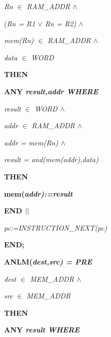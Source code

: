 \begin{sloppypar}
\hspace*{0.20in}\it Rn $\in$  \it RAM\_ADDR  $\land$ 

\hspace*{0.20in}\rm (\it Rn \rm = \it R1  $\lor$  \it Rn \rm = \it R2\rm )  $\land$ 

\hspace*{0.20in}\it mem\rm (\it Rn\rm ) $\in$  \it RAM\_ADDR  $\land$ 

\hspace*{0.20in}\it data $\in$  \it WORD

\hspace*{0.10in}\bf THEN

\hspace*{0.20in}\bf ANY \it result\rm ,\it addr \bf WHERE

\hspace*{0.30in}\it result $\in$  \it WORD  $\land$ 

\hspace*{0.30in}\it addr $\in$  \it RAM\_ADDR  $\land$ 

\hspace*{0.30in}\it addr \rm = \it mem\rm (\it Rn\rm )  $\land$ 

\hspace*{0.30in}\it result \rm = \it and\rm (\it mem\rm (\it addr\rm )\rm ,\it data\rm )

\hspace*{0.20in}\bf THEN

\hspace*{0.30in}\bf mem\rm (\it addr\rm )\rm :=\it result

\hspace*{0.20in}\bf END  $\mbox{$\mid\mid$}$ 

\hspace*{0.20in}\it pc\rm :=\it INSTRUCTION\_NEXT\rm (\it pc\rm )

\hspace*{0.10in}\bf END\rm ;

\hspace*{0.10in}\bf ANLM\rm (\it dest\rm ,\it src\rm ) \rm = \bf PRE

\hspace*{0.20in}\it dest $\in$  \it MEM\_ADDR  $\land$ 

\hspace*{0.20in}\it src $\in$  \it MEM\_ADDR

\hspace*{0.10in}\bf THEN

\hspace*{0.20in}\bf ANY \it result \bf WHERE


\end{sloppypar}
